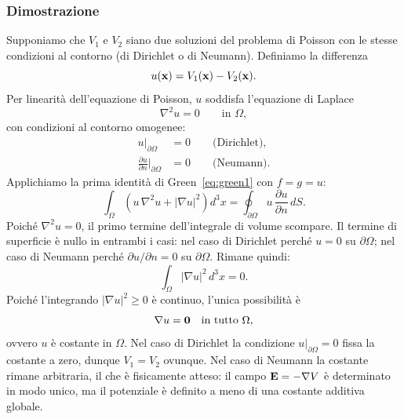 \subsubsection{Dimostrazione}

Supponiamo che $V_1$ e $V_2$ siano due soluzioni del problema di Poisson con le
stesse condizioni al contorno (di Dirichlet o di Neumann). Definiamo la differenza
\begin{equation}
    u(\mathbf{x}) = V_1(\mathbf{x}) - V_2(\mathbf{x}).
\end{equation}
Per linearità dell'equazione di Poisson, $u$ soddisfa l'equazione di Laplace
\begin{equation}
    \nabla^2 u = 0 \qquad \text{in } \Omega,
\end{equation}
con condizioni al contorno omogenee:
\begin{align}
    u\big|_{\partial\Omega} &= 0 \qquad \text{(Dirichlet)}, \\
    \frac{\partial u}{\partial n}\bigg|_{\partial\Omega} &= 0 \qquad \text{(Neumann)}.
\end{align}
Applichiamo la prima identità di Green~\eqref{eq:green1} con $f = g = u$:
\begin{equation}
    \int_\Omega \left( u\, \nabla^2 u + |\nabla u|^2 \right) d^3x
    = \oint_{\partial\Omega} u\, \frac{\partial u}{\partial n}\, dS.
\end{equation}
Poiché $\nabla^2 u = 0$, il primo termine dell'integrale di volume scompare.
Il termine di superficie è nullo in entrambi i casi:
nel caso di Dirichlet perché $u = 0$ su $\partial\Omega$;
nel caso di Neumann perché $\partial u / \partial n = 0$ su $\partial\Omega$.
Rimane quindi:
\begin{equation}
    \int_\Omega |\nabla u|^2 \, d^3x = 0.
\end{equation}
Poiché l'integrando $|\nabla u|^2 \geq 0$ è continuo, l'unica possibilità è
\begin{equation}
    \nabla u = \mathbf{0} \quad \text{in tutto } \Omega,
\end{equation}
ovvero $u$ è costante in $\Omega$. Nel caso di Dirichlet la condizione $u|_{\partial\Omega}=0$
fissa la costante a zero, dunque $V_1 = V_2$ ovunque. Nel caso di Neumann la costante
rimane arbitraria, il che è fisicamente atteso: il campo $\mathbf{E} = -\nabla V$ è determinato
in modo unico, ma il potenziale è definito a meno di una costante additiva globale.

